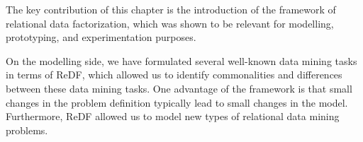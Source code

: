 The key contribution of this chapter is the introduction of the framework of relational data factorization,  
which was shown to be relevant for modelling, prototyping, and experimentation purposes. 

On the modelling side, we have formulated several well-known data mining tasks in terms of ReDF, 
which allowed us to identify commonalities and differences between these data mining tasks. 
One advantage of the framework is that small changes in the problem definition typically lead to small changes in the model. Furthermore, ReDF allowed us to model new types of relational data mining problems.

 





